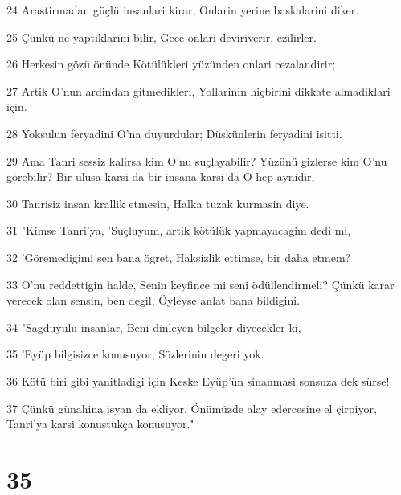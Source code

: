 \par 24 Arastirmadan güçlü insanlari kirar, Onlarin yerine baskalarini diker.
\par 25 Çünkü ne yaptiklarini bilir, Gece onlari deviriverir, ezilirler.
\par 26 Herkesin gözü önünde Kötülükleri yüzünden onlari cezalandirir;
\par 27 Artik O'nun ardindan gitmedikleri, Yollarinin hiçbirini dikkate almadiklari için.
\par 28 Yoksulun feryadini O'na duyurdular; Düskünlerin feryadini isitti.
\par 29 Ama Tanri sessiz kalirsa kim O'nu suçlayabilir? Yüzünü gizlerse kim O'nu görebilir? Bir ulusa karsi da bir insana karsi da O hep aynidir,
\par 30 Tanrisiz insan krallik etmesin, Halka tuzak kurmasin diye.
\par 31 "Kimse Tanri'ya, 'Suçluyum, artik kötülük yapmayacagim dedi mi,
\par 32 'Göremedigimi sen bana ögret, Haksizlik ettimse, bir daha etmem?
\par 33 O'nu reddettigin halde, Senin keyfince mi seni ödüllendirmeli? Çünkü karar verecek olan sensin, ben degil, Öyleyse anlat bana bildigini.
\par 34 "Sagduyulu insanlar, Beni dinleyen bilgeler diyecekler ki,
\par 35 'Eyüp bilgisizce konusuyor, Sözlerinin degeri yok.
\par 36 Kötü biri gibi yanitladigi için Keske Eyüp'ün sinanmasi sonsuza dek sürse!
\par 37 Çünkü günahina isyan da ekliyor, Önümüzde alay edercesine el çirpiyor, Tanri'ya karsi konustukça konusuyor."

\chapter{35}

